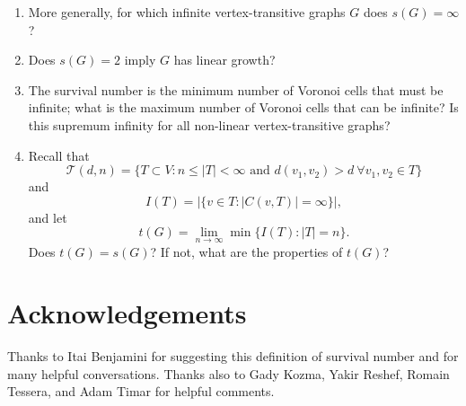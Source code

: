 \documentclass[11pt]{article}
\newcommand{\T}{\mathcal{T}}
\begin{document}
\begin{enumerate}
\item More generally, for which infinite vertex-transitive graphs $G$ does $s(G) = \infty$?

\item Does $s(G) = 2$ imply $G$ has linear growth?

\item The survival number is the minimum number of Voronoi cells that must be infinite; what is the maximum number of Voronoi cells that can be infinite? Is this supremum infinity for all non-linear vertex-transitive graphs? 

\item Recall that 
$$\T(d,n) = \{T \subset V: n \leq |T| < \infty \mbox{ and }d(v_1, v_2)>d\ \forall v_1, v_2 \in T\}$$ 
and
$$I(T) = \bigl|\{v \in T : |C(v,T)| = \infty\}\bigr|,$$ 
and let 
$$t(G) = \lim_{n \rightarrow \infty} \min\{I(T) : |T| = n\}.$$ 
Does $t(G) = s(G)$? If not, what are the properties of $t(G)$?

\end{enumerate}


\section{Acknowledgements}
Thanks to Itai Benjamini for suggesting this definition of survival number and for many helpful conversations. Thanks also to Gady Kozma, Yakir Reshef, Romain Tessera, and Adam Timar for helpful comments.



\end{document}
